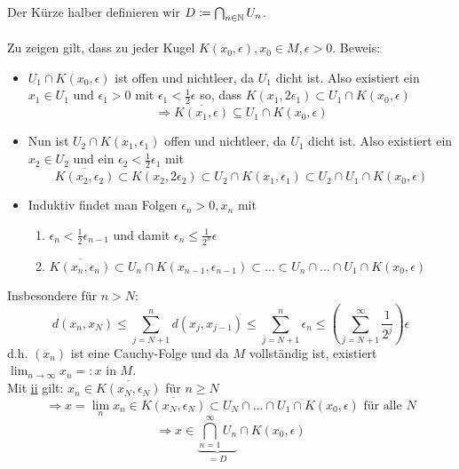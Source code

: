 \begin{beweis}
    Der Kürze halber definieren wir $D \coloneqq \bigcap_{n \in \mathbb{N}} U_{n}$. \\ \\
    Zu zeigen gilt, dass zu jeder Kugel $K(x_{0}, \epsilon), x_{0} \in M, \epsilon > 0$.
	Beweis: 
	\begin{itemize}
		\item $U_{1} \cap K(x_{0}, \epsilon)$ ist offen und nichtleer, da $U_{1}$ dicht ist. Also existiert ein $x_{1} \in U_{1}$ und $\epsilon_{1} > 0$ mit $\epsilon_{1} < \frac{1}{2} \epsilon$ so, dass $K( x_{1}, 2 \epsilon_{1}) \subset U_{1} \cap K(x_{0}, \epsilon)$
			\[ \Rightarrow \overline{K(x_{1}, \epsilon)} \subseteq U_{1} \cap K(x_{0}, \epsilon) \]
		\item Nun ist $U_{2} \cap K(x_{1}, \epsilon_{1})$  offen und nichtleer, da $U_{1}$ dicht ist. Also existiert ein $x_{2} \in U_{2}$ und ein $\epsilon_{2} < \frac{1}{2} \epsilon_{1}$ mit
			\[ \overline{K(x_{2}, \epsilon_{2})} \subset K(x_{2}, 2 \epsilon_{2}) \subset U_{2} \cap K(x_{1}, \epsilon_{1}) \subset U_{2} \cap U_{1} \cap K(x_{0}, \epsilon) \]
		\item Induktiv findet man Folgen $\epsilon_{n} > 0, x_{n}$ mit
			\begin{enumerate}[label=(\roman*\upshape)]
				\item $\epsilon_{n} < \frac{1}{2} \epsilon_{n - 1}$ und damit $\epsilon_{n} \leq \frac{1}{2^{n}} \epsilon$
				\label{satz:9.1-proof-ii}
				\item $\overline{K(x_{n}, \epsilon_{n})} \subset U_{n} \cap K(x_{n - 1}, \epsilon_{n - 1}) \subset \dotsc \subset U_{n} \cap \dotsc \cap U_{1} \cap K(x_{0}, \epsilon)$
			\end{enumerate}
	\end{itemize}
	Insbesondere für $n > N$:
	\[ d(x_{n}, x_{N}) \leq \sum_{j = N + 1}^{n} d(x_{j}, x_{j - 1}) \leq \sum_{j = N + 1}^{n} \epsilon_{n} \leq \left( \sum_{j = N + 1}^{\infty} \frac{1}{2^{j}} \right) \epsilon \]
	d.h. $(x_{n})$ ist eine Cauchy-Folge und da $M$ vollständig ist, existiert $\lim_{n \rightarrow \infty} x_{n} =: x$ in $M$. \\
	Mit \hyperref[satz:9.1-proof-ii]{ii} gilt: $x_{n} \in \overline{K(x_{N}, \epsilon_{N})}$ für $n \geq N$
	\[ \Rightarrow x = \lim_{n} x_{n} \in \overline{K(x_{N}, \epsilon_{N})} \subset U_{N} \cap \dotsc \cap U_{1} \cap K(x_{0}, \epsilon) \text{ für alle } N \]
	\[ \Rightarrow x \in \underbrace{\bigcap_{n = 1}^{\infty} U_{n}}_{= D} \cap K(x_{0}, \epsilon) \]
\end{beweis}


